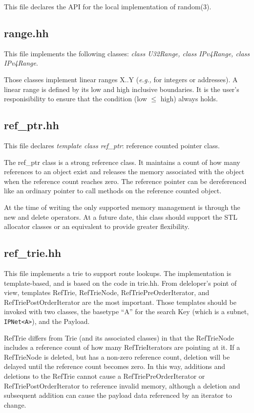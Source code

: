 \documentclass[11pt]{article}
\newcommand{\eg}{\emph{e.g.,}\xspace}
\begin{document}
This file declares the API for the local implementation of random(3).

\subsection{range.hh}

This file implements the following classes:
\emph{class U32Range, class IPv4Range, class IPv4Range}.

Those classes implement linear ranges X..Y (\eg for integers or
addresses). A linear range is defined by its low and high inclusive
boundaries. It is the user's responisibility to ensure that the
condition (low $\leq$ high) always holds.

\subsection{ref\_ptr.hh}

This file declares \emph{template class ref\_ptr}: reference counted
pointer class.

The ref\_ptr class is a strong reference class.  It maintains a count of
how many references to an object exist and releases the memory associated
with the object when the reference count reaches zero.  The reference
pointer can be dereferenced like an ordinary pointer to call methods
on the reference counted object.

At the time of writing the only supported memory management is
through the new and delete operators.  At a future date, this class
should support the STL allocator classes or an equivalent to
provide greater flexibility.

\subsection{ref\_trie.hh}

This file implements a trie to support route lookups.  The
implementation is template-based, and is based on the code in
trie.hh. From deleloper's point of view, templates RefTrie, RefTrieNode,
RefTriePreOrderIterator, and RefTriePostOrderIterator are the most important.
Those templates should be invoked
with two classes, the basetype ``A'' for the search Key (which is a
subnet, \verb=IPNet<A>=), and the Payload.

RefTrie differs from Trie (and its associated classes) in that the
RefTrieNode includes a reference count of how many RefTrieIterators
are pointing at it.  If a RefTrieNode is deleted, but has a non-zero
reference count, deletion will be delayed until the reference count
becomes zero.  In this way, additions and deletions to the RefTrie
cannot cause a RefTriePreOrderIterator or RefTriePostOrderIterator
to reference invalid memory, although a deletion and subsequent addition can
cause the payload data referenced by an iterator to change.
\end{document}
